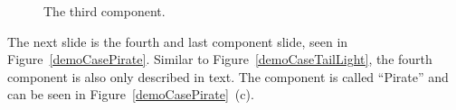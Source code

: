 	\begin{figure}[ht!]
		\centering
		\qquad
		\qquad
		\caption{The third component.}
		\label{demoCaseBody}
	\end{figure}
	
The next slide is the fourth and last component slide, seen in Figure~\ref{demoCasePirate}. Similar to Figure~\ref{demoCaseTailLight}, the fourth component is also only described in text. The component is called ``Pirate'' and can be seen in Figure~\ref{demoCasePirate}~(c).


